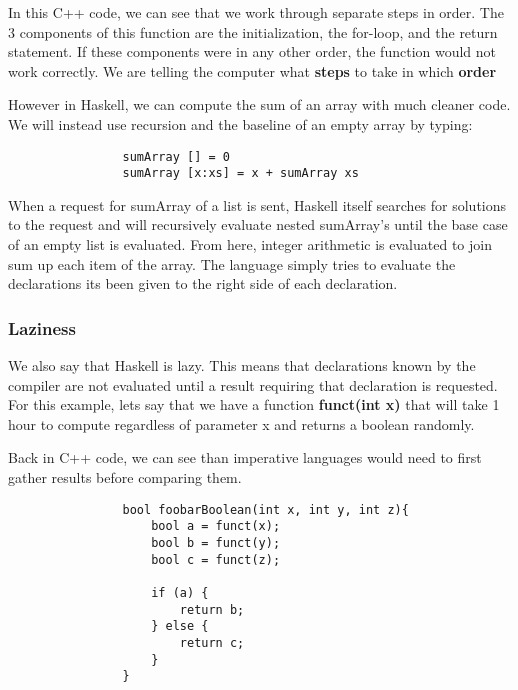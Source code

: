 \documentclass{article}
\begin{document}
            \medskip\noindent
            In this C++ code, we can see that we work through separate steps in order. The 3 components of this function are the initialization, the for-loop, and the return statement. If these components were in any other order, the function would not work correctly. We are telling the computer what \textbf{steps} to take in which \textbf{order}
            
            \bigskip\noindent 
            However in Haskell, we can compute the sum of an array with much cleaner code. We will instead use recursion and the baseline of an empty array by typing:
            \begin{lstlisting}
                sumArray [] = 0
                sumArray [x:xs] = x + sumArray xs
            \end{lstlisting}
            
            \medskip\noindent
            When a request for sumArray of a list is sent, Haskell itself searches for solutions to the request and will recursively evaluate nested sumArray's until the base case of an empty list is evaluated. From here, integer arithmetic is evaluated to join sum up each item of the array. The language simply tries to evaluate the declarations its been given to the right side of each declaration. 
            
        \subsubsection{Laziness}
        We also say that Haskell is lazy. This means that declarations known by the compiler are not evaluated until a result requiring that declaration is requested. For this example, lets say that we have a function \textbf{funct(int x)} that will take 1 hour to compute regardless of parameter x and returns a boolean randomly.
        
            \medskip\noindent
            Back in C++ code, we can see than imperative languages would need to first gather results before comparing them.
            \begin{lstlisting}
                bool foobarBoolean(int x, int y, int z){
                    bool a = funct(x);
                    bool b = funct(y);
                    bool c = funct(z);
                    
                    if (a) {
                        return b;
                    } else {
                        return c;
                    }
                }
            \end{lstlisting}
            
\end{document}
